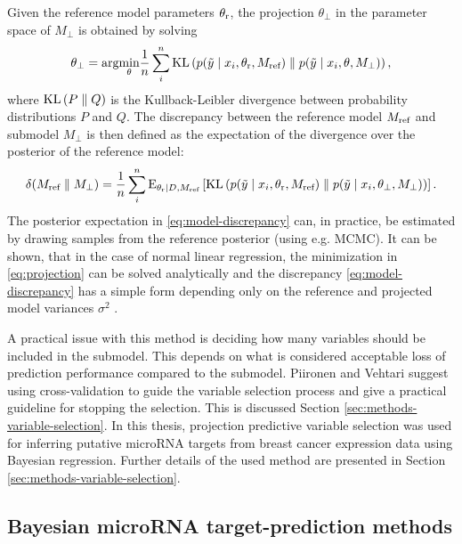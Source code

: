Given the reference model parameters $\theta_{\textup{r}}$, the projection $\theta_\perp$
in the parameter space of $M_\perp$ is obtained by solving
\begin{equation}
  \label{eq:projection}
  \theta_\perp = \textup{arg}\underset{\theta}{\textup{min}} \frac{1}{n}\sum_i^n \textup{KL} \left ( p(\tilde{y} \mid x_i, \theta_{\textup{r}}, M_{\textup{ref}}) \parallel p(\tilde{y} \mid x_i, \theta, M_\perp) \right ),
\end{equation}
where $\textup{KL} \left ( P \parallel Q \right )$ is the Kullback-Leibler divergence
between probability distributions $P$ and $Q$. The discrepancy between the reference
model  $M_{\textup{ref}}$ and submodel $M_\perp$ is then defined as the expectation
of the divergence over the posterior of the reference model:
\begin{equation}
  \label{eq:model-discrepancy}
  \delta(M_{\textup{ref}} \parallel M_\perp) = \frac{1}{n} \sum_i^n \textup{E}_{\theta_{\textup{r}} \mid D,M_\textup{ref}} \left [ \textup{KL} \left ( p(\tilde{y} \mid x_i, \theta_{\textup{r}}, M_{\textup{ref}}) \parallel p(\tilde{y} \mid x_i, \theta_\perp, M_\perp) \right ) \right ].
\end{equation}
The posterior expectation in \eqref{eq:model-discrepancy} can, in practice, be
estimated by drawing samples from the reference posterior (using e.g. MCMC).
It can be shown, that in the case of normal linear regression, the
minimization in \eqref{eq:projection} can be solved analytically and the
discrepancy \eqref{eq:model-discrepancy} has a simple form depending only on
the reference and projected model variances $\sigma^2$ \citep{Piironen2015}.

A practical issue with this method is deciding how many variables should be
included in the submodel. This depends on what is considered acceptable
loss of prediction performance compared to the submodel. Piironen and Vehtari suggest using cross-validation to
guide the variable selection process and give a practical guideline for
stopping the selection. This is discussed Section \ref{sec:methods-variable-selection}.
In this thesis, projection predictive variable selection was used
for inferring putative microRNA targets from breast cancer expression data
using Bayesian regression. Further details of the used method are presented in
Section \ref{sec:methods-variable-selection}.




\subsection{Bayesian microRNA target-prediction methods}

